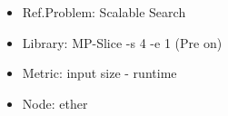 \begin{frame}
\begin{minipage}{.41\paperwidth}
\begin{figure}
        \begin{itemize}
            \item Ref.Problem: Scalable Search
            \item Library: MP-Slice -s 4 -e 1 (Pre on)
            \item Metric: input size - runtime
            \item Node: ether
        \end{itemize}
    \end{figure}
    \end{minipage}

\end{frame}


